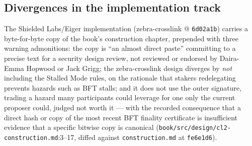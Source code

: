 \documentclass[11pt,a4paper]{article}
\theoremstyle{definition}
\begin{document}
\subsection{Divergences in the implementation track}
\label{sec:xl-divergences}

The Shielded Labs/Eiger implementation (zebra-crosslink @
\texttt{6d02a1b}) carries a byte-for-byte copy of the book's construction
chapter, prepended with three warning admonitions: the copy is ``an
almost direct paste'' committing to a precise text for a security design
review, not reviewed or endorsed by Daira-Emma Hopwood or Jack Grigg; the
zebra-crosslink design diverges by \emph{not} including the Stalled Mode
rules, on the rationale that stakers redelegating prevents hazards such
as BFT stalls; and it does not use the outer signature, trading a hazard
many participants could leverage for one only the current proposer could,
judged not worth it --- with the recorded consequence that a direct hash
or copy of the most recent BFT finality certificate is insufficient
evidence that a specific bitwise copy is canonical
(\texttt{book/src/design/cl2-construction.md}:3--17, diffed against
\texttt{construction.md} at \texttt{fe6e1d6}).
\end{document}
